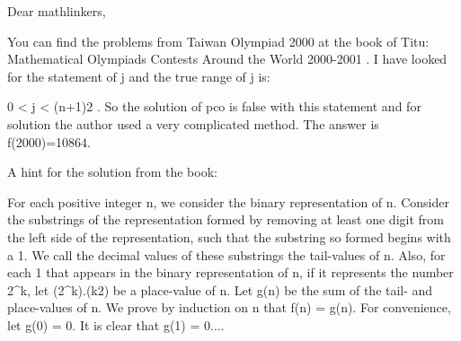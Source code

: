 \begin{solution}
	Dear mathlinkers,

    You can find the problems from Taiwan Olympiad 2000 at the book of Titu: Mathematical Olympiads Contests Around the World 2000-2001 . I have looked for the statement of j and the true range of j is:
 
      0 < j < (n+1)\/2 . So the solution of pco is false with this statement and for solution the author used a very complicated method. The answer is
 f(2000)=10864. 
 
        A hint for the solution from the book:

      For each positive integer n, we consider the binary
representation of n. Consider the substrings of the representation
formed by removing at least one digit from the left side of the
representation, such that the substring so formed begins with a 1.
We call the decimal values of these substrings the tail-values of n.
Also, for each 1 that appears in the binary representation of n, if it
represents the number 2^k, let (2^k).(k\/2) be a place-value of n. Let g(n) be the sum of the tail- and place-values of n. We prove by induction on n that f(n) = g(n). For convenience, let g(0) = 0.
It is clear that g(1) = 0....
\end{solution}



